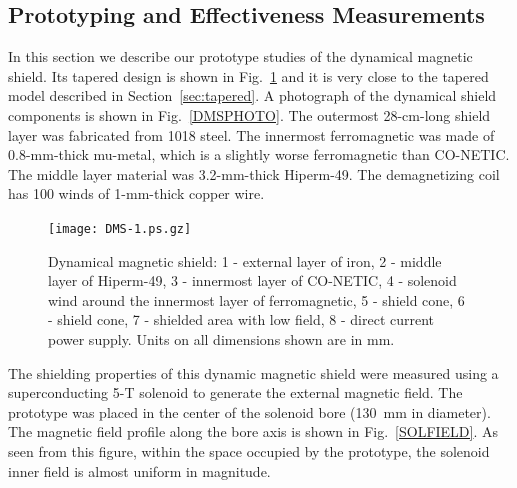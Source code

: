\documentclass[12pt]{article}
\begin{document}
\subsection{Prototyping and Effectiveness Measurements}
\label{sec:tests}

In this section we describe our prototype studies of the dynamical magnetic shield. 
Its tapered design is shown in Fig.~\ref{fig:DMS} and it is very close to the 
tapered model described in Section~\ref{sec:tapered}. A photograph of the dynamical 
shield components is shown in Fig.~\ref{DMSPHOTO}. The outermost 28-cm-long shield 
layer was fabricated from 1018 steel. The innermost ferromagnetic was made of 
0.8-mm-thick mu-metal, which is a slightly worse ferromagnetic than CO-NETIC. The 
middle layer material was 3.2-mm-thick Hiperm-49. The demagnetizing coil has 
100 winds of 1-mm-thick copper wire.

\begin{figure}[htbp]
\texttt{[image: DMS-1.ps.gz]}
\caption{Dynamical magnetic shield: 1 - external layer of iron, 2 - middle layer 
of Hiperm-49, 3 - innermost layer of CO-NETIC, 4 - solenoid wind around the 
innermost layer of ferromagnetic, 5 - shield cone, 6 - shield cone, 7 - shielded 
area with low field, 8 - direct current power supply. Units on all dimensions
shown are in mm.}
\label{fig:DMS}
\end{figure}

The shielding properties of this dynamic magnetic shield were measured using a 
superconducting 5-T solenoid to generate the external magnetic field. The prototype 
was placed in the center of the solenoid bore (130~mm in diameter). The magnetic 
field profile along the bore axis is shown in Fig.~\ref{SOLFIELD}. As seen from 
this figure, within the space occupied by the prototype, the solenoid inner field 
is almost uniform in magnitude.
\end{document}
